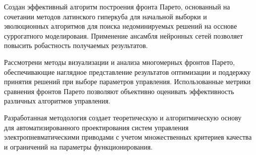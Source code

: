 Создан эффективный алгоритм построения фронта Парето, основанный на сочетании методов
латинского гиперкуба для начальной выборки и эволюционных алгоритмов для поиска недоминируемых
решений на осснове суррогатного моделироваия. Применение ансамбля нейронных сетей позволяет повысить робастность получаемых результатов.

Рассмотрени методы визуализации и анализа многомерных фронтов Парето, обеспечивающие наглядное
представление результатов оптимизации и поддержку принятия решений при выборе параметров управления. Использованные метрики
сравнения фронтов Парето позволяют объективно оценивать эффективность различных алгоритмов управления.

Разработанная методология создает теоретическую и алгоритмическую основу для
автоматизированного проектирования систем управления электропневматическими
приводами с учетом множественных критериев качества и ограничений на параметры функционирования.


